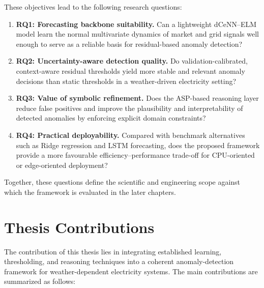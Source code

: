 These objectives lead to the following research questions:
\begin{enumerate}
    \item \textbf{RQ1: Forecasting backbone suitability.} Can a lightweight dCeNN--ELM model learn the normal multivariate dynamics of market and grid signals well enough to serve as a reliable basis for residual-based anomaly detection?

    \item \textbf{RQ2: Uncertainty-aware detection quality.} Do validation-calibrated, context-aware residual thresholds yield more stable and relevant anomaly decisions than static thresholds in a weather-driven electricity setting?

    \item \textbf{RQ3: Value of symbolic refinement.} Does the ASP-based reasoning layer reduce false positives and improve the plausibility and interpretability of detected anomalies by enforcing explicit domain constraints?

    \item \textbf{RQ4: Practical deployability.} Compared with benchmark alternatives such as Ridge regression and LSTM forecasting, does the proposed framework provide a more favourable efficiency--performance trade-off for CPU-oriented or edge-oriented deployment?
\end{enumerate}

Together, these questions define the scientific and engineering scope against which
the framework is evaluated in the later chapters.

\section{Thesis Contributions}


The contribution of this thesis lies in integrating established learning,
thresholding, and reasoning techniques into a coherent anomaly-detection framework
for weather-dependent electricity systems. The main contributions are summarized
as follows:

